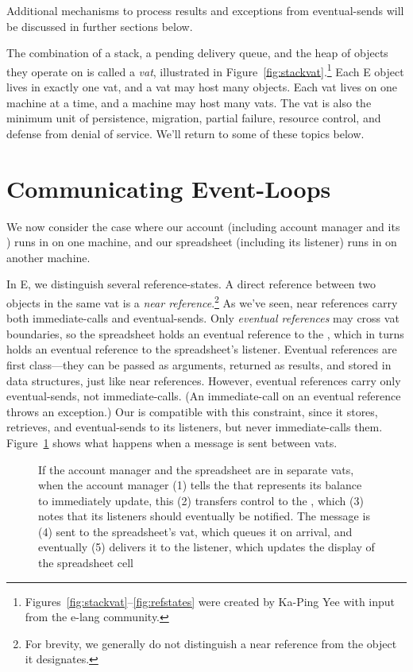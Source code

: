 \documentclass{llncs}
\begin{document}
Additional mechanisms to process results and exceptions from
eventual-sends will be discussed in further sections below.

The combination of a stack, a pending delivery queue, and the heap of
objects they operate on is called a \emph{vat}, illustrated in
Figure~\ref{fig:stackvat}.\footnote{
%
Figures~\ref{fig:stackvat}--\ref{fig:refstates} were created by
Ka-Ping Yee with input from the e-lang community.}
%
Each E object lives in exactly one vat, and a vat may host many
objects.  Each vat lives on one machine at a time, and a machine may
host many vats. The vat is also the minimum unit of persistence,
migration, partial failure, resource control, and defense from denial
of service. We'll return to some of these topics below.

\section{Communicating Event-Loops}

We now consider the case where our account (including account manager
and its ) runs in  on one machine, and our
spreadsheet (including its listener) runs in  on another
machine.

In E, we distinguish several reference-states. A direct reference
between two objects in the same vat is a \emph{near
reference}.\footnote{
%
For brevity, we generally do not distinguish a near reference from the
object it designates.}
%
As we've seen, near references carry both immediate-calls and
eventual-sends. Only \emph{eventual references} may cross vat
boundaries, so the spreadsheet holds an eventual reference to the
, which in turns holds an eventual reference to the
spreadsheet's listener. Eventual references are first class---they can
be passed as arguments, returned as results, and stored in data
structures, just like near references. However, eventual references
carry only eventual-sends, not immediate-calls. (An immediate-call on
an eventual reference throws an exception.) Our  is
compatible with this constraint, since it stores, retrieves, and
eventual-sends to its listeners, but never immediate-calls them.
Figure~\ref{fig:2vat} shows what happens when a message is sent
between vats.

\begin{figure}
\centerline{}
\caption{If the account manager and the spreadsheet are in separate
  vats, when the account manager (1) tells the 
  that represents its balance to immediately update, this (2)
  transfers control to the , which (3) notes that
  its listeners should eventually be notified. The message is (4) sent
  to the spreadsheet's vat, which queues it on arrival, and eventually
  (5) delivers it to the listener, which updates the display of the
  spreadsheet cell}
\label{fig:2vat}
\end{figure}
\end{document}
